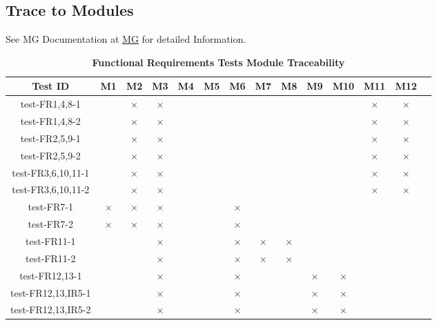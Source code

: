 \documentclass[12pt, titlepage]{article}
\begin{document}
\begin{landscape}
\newpage
		
\section{Trace to Modules}

See MG Documentation at \href{https://github.com/PKALXI/RapidCare/blob/main/docs/Design/SoftArchitecture/MG.pdf} {MG} for detailed Information.\\

\begin{table}[H]
  \centering
  \begin{tabular}{|c|c|c|c|c|c|c|c|c|c|c|c|c|c|}
  \hline
  Test ID & M1 & M2 & M3 & M4 & M5 & M6 & M7 & M8 & M9 & M10 & M11 & M12 \\
  \hline
  test-FR1,4,8-1 & & $\times$ & $\times$ & & & & & & & & $\times$ & $\times$ \\
  \hline
  test-FR1,4,8-2 & & $\times$ & $\times$ & & & & & & & & $\times$ & $\times$ \\
  \hline
  test-FR2,5,9-1 & & $\times$ & $\times$ & & & & & & & & $\times$ & $\times$ \\
  \hline
  test-FR2,5,9-2 & & $\times$ & $\times$ & & & & & & & & $\times$ & $\times$ \\
  \hline
  test-FR3,6,10,11-1 & & $\times$ & $\times$ & & & & & & & & $\times$ & $\times$ \\
  \hline
  test-FR3,6,10,11-2 & & $\times$ & $\times$ & & & & & & & & $\times$ & $\times$ \\
  \hline
  test-FR7-1 & $\times$ & $\times$ & $\times$ & & & $\times$ & & & & & & \\
  \hline
  test-FR7-2 & $\times$ & $\times$ & $\times$ & & & $\times$ & & & & & & \\
  \hline
  test-FR11-1 & & & $\times$ & & & $\times$ & $\times$ & $\times$ & & & & \\
  \hline
  test-FR11-2 & & & $\times$ & & & $\times$ & $\times$ & $\times$ & & & & \\
  \hline
  test-FR12,13-1 & & & $\times$ & & & $\times$ & & & $\times$ & $\times$ & & \\
  \hline
  test-FR12,13,IR5-1 & & & $\times$ & & & $\times$ & & & $\times$ & $\times$ & & \\
  \hline
  test-FR12,13,IR5-2 & & & $\times$ & & & $\times$ & & & $\times$ & $\times$ & & \\
  \hline
\end{tabular}
\caption{\bf Functional Requirements Tests Module Traceability} \label{tab:fr-test-traceability}
\end{table}


\end{landscape}
\end{document}
